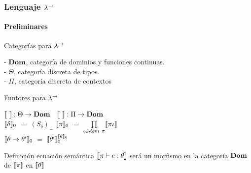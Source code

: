 \documentclass{beamer}
\begin{document}
\begin{frame}
\frametitle{Lenguaje $\lambda^{\rightarrow}$}
\framesubtitle{Preliminares}

\begin{block}{Categorías para $\lambda^{\rightarrow}$}

- $\textbf{Dom}$, categoría de dominios y funciones continuas.\\
- $\Theta$, categoría discreta de tipos.\\
- $\Pi$, categoría discreta de contextos

\end{block}

\pause

\begin{block}{Funtores para $\lambda^{\rightarrow}$}

$\llbracket  \  \rrbracket : \Theta \rightarrow \textbf{Dom}$ 
\quad \quad \quad \
$\llbracket  \  \rrbracket : \Pi \rightarrow \textbf{Dom}$\\
$\llbracket \delta \rrbracket_0$ $=$ $(S_\delta)_\bot$
\quad \quad \quad \quad
$\llbracket \pi \rrbracket_0$ $=$ $\prod\limits_{\iota \in dom \ \pi} \llbracket \pi\iota \rrbracket$\\
$\llbracket \theta \rightarrow \theta' \rrbracket_0$ $=$ $\llbracket \theta' \rrbracket_0^{\llbracket \theta \rrbracket_0}$

\end{block}

\pause

\begin{block}{Definición ecuación semántica}
$\llbracket \pi \vdash e : \theta \rrbracket$ será un morfismo en la categoría $\textbf{Dom}$ de
$\llbracket \pi \rrbracket$ en $\llbracket \theta \rrbracket$
\end{block}

\end{frame}
\end{document}
